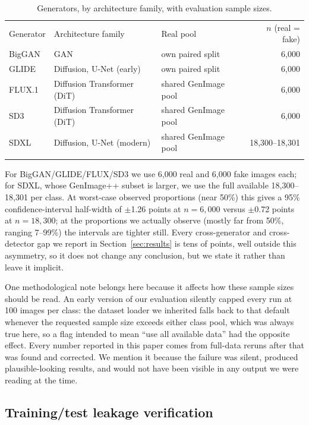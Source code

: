 \documentclass[3p,times,procedia]{elsarticle}
\begin{document}
\begin{table}[h]
\caption{Generators, by architecture family, with evaluation sample sizes.}
\label{tab:generators}
\begin{tabular*}{\hsize}{@{\extracolsep{\fill}}lllr@{}}
\toprule
Generator & Architecture family & Real pool & $n$ (real = fake) \\
\colrule
BigGAN & GAN & own paired split & 6{,}000 \\
GLIDE & Diffusion, U-Net (early) & own paired split & 6{,}000 \\
FLUX.1 & Diffusion Transformer (DiT) & shared GenImage pool & 6{,}000 \\
SD3 & Diffusion Transformer (DiT) & shared GenImage pool & 6{,}000 \\
SDXL & Diffusion, U-Net (modern) & shared GenImage pool & 18{,}300--18{,}301 \\
\botrule
\end{tabular*}
\end{table}

For BigGAN/GLIDE/FLUX/SD3 we use 6{,}000 real and 6{,}000 fake images each;
for SDXL, whose GenImage++ subset is larger, we use the full available
18{,}300--18{,}301 per class. At worst-case observed proportions (near
50\%) this gives a 95\% confidence-interval half-width of $\pm$1.26 points
at $n=6{,}000$ versus $\pm$0.72 points at $n=18{,}300$; at the proportions
we actually observe (mostly far from 50\%, ranging 7--99\%) the intervals
are tighter still. Every cross-generator and cross-detector gap we report
in Section~\ref{sec:results} is tens of points, well outside this
asymmetry, so it does not change any conclusion, but we state it rather
than leave it implicit.

One methodological note belongs here because it affects how these sample
sizes should be read. An early version of our evaluation silently capped
every run at 100 images per class: the dataset loader we inherited falls
back to that default whenever the requested sample size exceeds either
class pool, which was always true here, so a flag intended to mean ``use
all available data'' had the opposite effect. Every number reported in this
paper comes from full-data reruns after that was found and corrected. We
mention it because the failure was silent, produced plausible-looking
results, and would not have been visible in any output we were reading at
the time.

\subsection{Training/test leakage verification}
\label{sec:methods-leakage}
\end{document}
